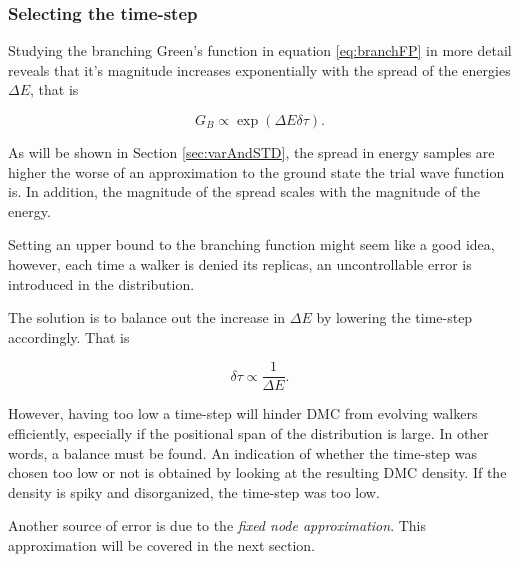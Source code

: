 \subsubsection{Selecting the time-step}

Studying the branching Green's function in equation \ref{eq:branchFP} in more detail reveals that it's magnitude increases exponentially with the spread of the energies $\Delta E$, that is

\begin{equation}
G_B \propto \exp{\left(\Delta E\delta\tau\right)}. 
\end{equation}

As will be shown in Section \ref{sec:varAndSTD}, the spread in energy samples are higher the worse of an approximation to the ground state the trial wave function is. In addition, the magnitude of the spread scales with the magnitude of the energy. 

Setting an upper bound to the branching function might seem like a good idea, however, each time a walker is denied its replicas, an uncontrollable error is introduced in the distribution.

The solution is to balance out the increase in $\Delta E$ by lowering the time-step accordingly. That is

\begin{equation}
 \delta\tau \propto \frac{1}{\Delta E}.
\end{equation}

However, having too low a time-step will hinder DMC from evolving walkers efficiently, especially if the positional span of the distribution is large. In other words, a balance must be found. An indication of whether the time-step was chosen too low or not is obtained by looking at the resulting DMC density. If the density is spiky and disorganized, the time-step was too low. 

Another source of error is due to the \textit{fixed node approximation}. This approximation will be covered in the next section.

